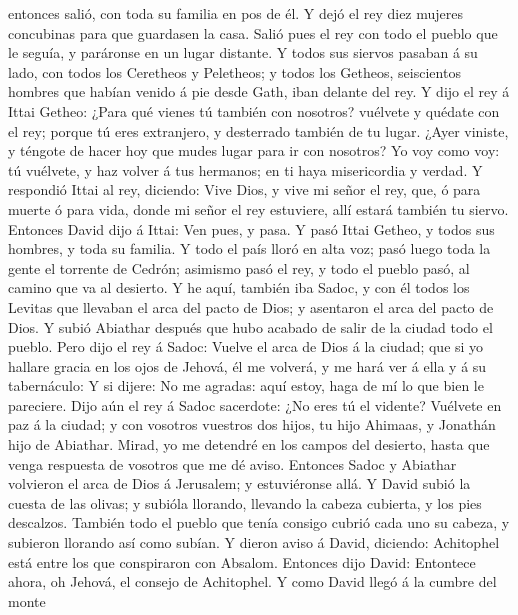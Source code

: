 entonces salió, con toda su familia en pos de él. Y dejó el rey diez
mujeres concubinas para que guardasen la casa.  Salió
pues el rey con todo el pueblo que le seguía, y paráronse en un lugar
distante.  Y todos sus siervos pasaban á su lado, con
todos los Ceretheos y Peletheos; y todos los Getheos, seiscientos
hombres que habían venido á pie desde Gath, iban delante del rey.
 Y dijo el rey á Ittai Getheo: ¿Para qué vienes tú
también con nosotros? vuélvete y quédate con el rey; porque tú eres
extranjero, y desterrado también de tu lugar.  ¿Ayer
viniste, y téngote de hacer hoy que mudes lugar para ir con nosotros? Yo
voy como voy: tú vuélvete, y haz volver á tus hermanos; en ti haya
misericordia y verdad.  Y respondió Ittai al rey,
diciendo: Vive Dios, y vive mi señor el rey, que, ó para muerte ó para
vida, donde mi señor el rey estuviere, allí estará también tu siervo.
 Entonces David dijo á Ittai: Ven pues, y pasa. Y pasó
Ittai Getheo, y todos sus hombres, y toda su familia.  Y
todo el país lloró en alta voz; pasó luego toda la gente el torrente de
Cedrón; asimismo pasó el rey, y todo el pueblo pasó, al camino que va al
desierto.  Y he aquí, también iba Sadoc, y con él todos
los Levitas que llevaban el arca del pacto de Dios; y asentaron el arca
del pacto de Dios. Y subió Abiathar después que hubo acabado de salir de
la ciudad todo el pueblo.  Pero dijo el rey á Sadoc:
Vuelve el arca de Dios á la ciudad; que si yo hallare gracia en los ojos
de Jehová, él me volverá, y me hará ver á ella y á su tabernáculo:
 Y si dijere: No me agradas: aquí estoy, haga de mí lo
que bien le pareciere.  Dijo aún el rey á Sadoc
sacerdote: ¿No eres tú el vidente? Vuélvete en paz á la ciudad; y con
vosotros vuestros dos hijos, tu hijo Ahimaas, y Jonathán hijo de
Abiathar.  Mirad, yo me detendré en los campos del
desierto, hasta que venga respuesta de vosotros que me dé aviso.
 Entonces Sadoc y Abiathar volvieron el arca de Dios á
Jerusalem; y estuviéronse allá.  Y David subió la cuesta
de las olivas; y subióla llorando, llevando la cabeza cubierta, y los
pies descalzos. También todo el pueblo que tenía consigo cubrió cada uno
su cabeza, y subieron llorando así como subían.  Y dieron
aviso á David, diciendo: Achitophel está entre los que conspiraron con
Absalom. Entonces dijo David: Entontece ahora, oh Jehová, el consejo de
Achitophel.  Y como David llegó á la cumbre del monte
